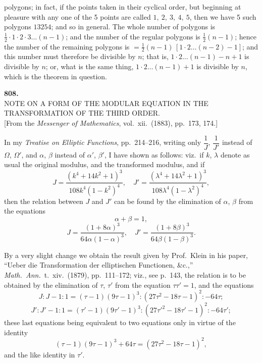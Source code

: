 \documentclass[11pt,a4paper]{article}
\begin{document}
\noindent polygons; in fact, if the points taken in their cyclical order, but beginning at pleasure with any one of the 5 points are called $1,\ 2,\ 3,\ 4,\ 5$, then we have 5 such polygons $13254$; and so in general.  The whole number of polygons is $\tfrac{1}{2}\cdot 1\cdot 2\cdot 3\ldots(n - 1)$; and the number of the regular polygons is $\tfrac{1}{2}(n - 1)$; hence the number of the remaining polygons is $= \tfrac{1}{2}(n - 1)\,[1\cdot 2\ldots(n - 2) - 1]$; and this number must therefore be divisible by $n$; that is, $1\cdot 2\ldots(n - 1) - n + 1$ is divisible by $n$; or, what is the same thing, $1\cdot 2\ldots(n - 1) + 1$ is divisible by $n$, which is the theorem in question.
\clearpage

\fancyhead[C]{\small\ }
\fancyhead[R]{\small [808}

\thispagestyle{plain}
\begin{center}
\vspace*{2em}
{\Large\bfseries 808.}\\[1.5em]
{\normalsize\scshape NOTE ON A FORM OF THE MODULAR EQUATION IN THE}\\[0.3em]
{\normalsize\scshape TRANSFORMATION OF THE THIRD ORDER.}\\[1em]
{\small [From the \textit{Messenger of Mathematics}, vol.~xii.\ (1883), pp.~173, 174.]}
\end{center}

\medskip
\noindent In my \textit{Treatise on Elliptic Functions}, pp.~214--216, writing only $\dfrac{1}{J}$, $\dfrac{1}{J'}$ instead of $\Omega$, $\Omega'$, and $\alpha$, $\beta$ instead of $\alpha'$, $\beta'$, I have shown as follows: viz.\ if $k$, $\lambda$ denote as usual the original modulus, and the transformed modulus, and if
\[
J = \frac{(k^{4} + 14k^{2} + 1)^{3}}{108k^{4}(1 - k^{2})^{4}},\quad J' = \frac{(\lambda^{4} + 14\lambda^{2} + 1)^{3}}{108\lambda^{4}(1 - \lambda^{2})^{4}},
\]
then the relation between $J$ and $J'$ can be found by the elimination of $\alpha$, $\beta$ from the equations
\[
\alpha + \beta = 1,
\]
\[
J = \frac{(1 + 8\alpha)^{3}}{64\alpha(1 - \alpha)^{3}},\quad J' = \frac{(1 + 8\beta)^{3}}{64\beta(1 - \beta)^{3}}.
\]

\medskip
By a very slight change we obtain the result given by Prof.\ Klein in his paper, ``Ueber die Transformation der elliptischen Functionen, \&c.,'' \textit{Math.\ Ann.}\ t.~xiv.\ (1879), pp.~111--172; viz., see p.~143, the relation is to be obtained by the elimination of $\tau$, $\tau'$ from the equation $\tau\tau' = 1$, and the equations
\[
J : J - 1 : 1 = (\tau - 1)(9\tau - 1)^{3} : (27\tau^{2} - 18\tau - 1)^{2} : -64\tau;
\]
\[
J' : J' - 1 : 1 = (\tau' - 1)(9\tau' - 1)^{3} : (27\tau'^{2} - 18\tau' - 1)^{2} : -64\tau';
\]
these last equations being equivalent to two equations only in virtue of the identity
\[
(\tau - 1)(9\tau - 1)^{3} + 64\tau = (27\tau^{2} - 18\tau - 1)^{2},
\]
and the like identity in $\tau'$.
\end{document}
